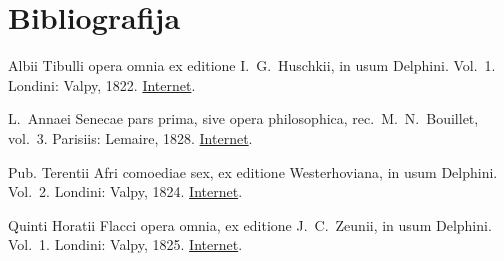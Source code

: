 \documentclass[a4paper,12pt,twoside]{book}
\begin{document}
\section*{Bibliografija}

{
\setlength{\parindent}{0pt}

Albii Tibulli opera omnia ex editione I.\ G.\ Huschkii, in usum Delphini. Vol.\ 1. Londini: Valpy, 1822. \href{https://archive.org/details/delphinclassics173valp}{Internet}.

L.\ Annaei Senecae pars prima, sive opera philosophica, rec.\ M.\ N.\ Bouillet, vol.\ 3. Parisiis: Lemaire, 1828. \href{https://archive.org/details/lannsenecparspr03bouigoog}{Internet}.

Pub. Terentii Afri comoediae sex, ex editione Westerhoviana, in usum Delphini. Vol.\ 2. Londini: Valpy, 1824. \href{https://archive.org/details/pubterentiiafric02tereuoft}{Internet}.

Quinti Horatii Flacci opera omnia, ex editione J.\ C.\ Zeunii, in usum Delphini. Vol.\ 1.  Londini: Valpy, 1825. \href{https://archive.org/details/delphinclassics57valp}{Internet}.

}
\end{document}
